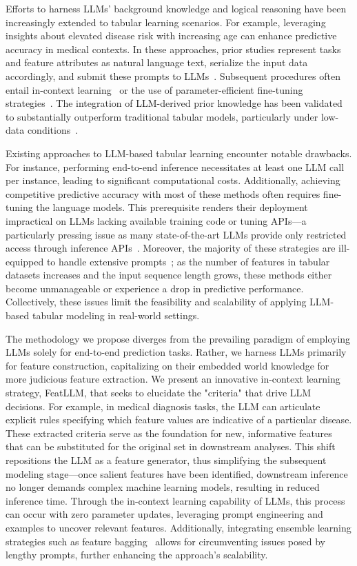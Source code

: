 Efforts to harness LLMs’ background knowledge and logical reasoning have been increasingly extended to tabular learning scenarios. For example, leveraging insights about elevated disease risk with increasing age can enhance predictive accuracy in medical contexts. In these approaches, prior studies represent tasks and feature attributes as natural language text, serialize the input data accordingly, and submit these prompts to LLMs~\cite{dinh2022lift,wang2023anypredict}. Subsequent procedures often entail in-context learning~\cite{nam2023semi} or the use of parameter-efficient fine-tuning strategies~\cite{dinh2022lift,hegselmann2023tabllm}. The integration of LLM-derived prior knowledge has been validated to substantially outperform traditional tabular models, particularly under low-data conditions~\cite{hegselmann2023tabllm}.

Existing approaches to LLM-based tabular learning encounter notable drawbacks. For instance, performing end-to-end inference necessitates at least one LLM call per instance, leading to significant computational costs. Additionally, achieving competitive predictive accuracy with most of these methods often requires fine-tuning the language models. This prerequisite renders their deployment impractical on LLMs lacking available training code or tuning APIs—a particularly pressing issue as many state-of-the-art LLMs provide only restricted access through inference APIs~\cite{anil2023palm,openai2023gpt4}. Moreover, the majority of these strategies are ill-equipped to handle extensive prompts~\cite{liu2023lost}; as the number of features in tabular datasets increases and the input sequence length grows, these methods either become unmanageable or experience a drop in predictive performance. Collectively, these issues limit the feasibility and scalability of applying LLM-based tabular modeling in real-world settings.

The methodology we propose diverges from the prevailing paradigm of employing LLMs solely for end-to-end prediction tasks. Rather, we harness LLMs primarily for feature construction, capitalizing on their embedded world knowledge for more judicious feature extraction. We present an innovative in-context learning strategy, \textsf{FeatLLM}, that seeks to elucidate the "criteria" that drive LLM decisions. For example, in medical diagnosis tasks, the LLM can articulate explicit rules specifying which feature values are indicative of a particular disease. These extracted criteria serve as the foundation for new, informative features that can be substituted for the original set in downstream analyses. This shift repositions the LLM as a feature generator, thus simplifying the subsequent modeling stage—once salient features have been identified, downstream inference no longer demands complex machine learning models, resulting in reduced inference time. Through the in-context learning capability of LLMs, this process can occur with zero parameter updates, leveraging prompt engineering and examples to uncover relevant features. Additionally, integrating ensemble learning strategies such as feature bagging~\cite{breiman2001random} allows for circumventing issues posed by lengthy prompts, further enhancing the approach's scalability.

